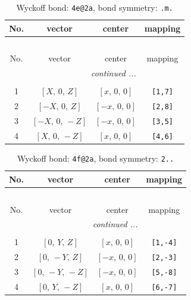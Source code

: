 \documentclass[fleqn,8pt]{jsarticle}
\begin{document}
\renewcommand{\arraystretch}{1.2}
\begin{longtable}{cccc}
\caption{Wyckoff bond: {\tt 4e@2a}, bond symmetry: {\tt .m.}}
 \\
 \hline \hline
No. & vector & center & mapping \\ \hline \endfirsthead

\multicolumn{3}{l}{\tablename\ \thetable{}} \\
 \hline \hline
No. & vector & center & mapping \\ \hline \endhead

 \hline \hline
\multicolumn{3}{r}{\footnotesize\it continued ...} \\ \endfoot

 \hline \hline
\multicolumn{3}{r}{} \\ \endlastfoot

1 & $\left[ X,\, 0,\, Z \right]$ & $\left[ x,\, 0,\, 0 \right]$ & {\tt [1,7]} \\ \hline
2 & $\left[ - X,\, 0,\, Z \right]$ & $\left[ - x,\, 0,\, 0 \right]$ & {\tt [2,8]} \\ \hline
3 & $\left[ - X,\, 0,\, - Z \right]$ & $\left[ - x,\, 0,\, 0 \right]$ & {\tt [3,5]} \\ \hline
4 & $\left[ X,\, 0,\, - Z \right]$ & $\left[ x,\, 0,\, 0 \right]$ & {\tt [4,6]} \\
\end{longtable}
\renewcommand{\arraystretch}{1.2}
\begin{longtable}{cccc}
\caption{Wyckoff bond: {\tt 4f@2a}, bond symmetry: {\tt 2..}}
 \\
 \hline \hline
No. & vector & center & mapping \\ \hline \endfirsthead

\multicolumn{3}{l}{\tablename\ \thetable{}} \\
 \hline \hline
No. & vector & center & mapping \\ \hline \endhead

 \hline \hline
\multicolumn{3}{r}{\footnotesize\it continued ...} \\ \endfoot

 \hline \hline
\multicolumn{3}{r}{} \\ \endlastfoot

1 & $\left[ 0,\, Y,\, Z \right]$ & $\left[ x,\, 0,\, 0 \right]$ & {\tt [1,-4]} \\ \hline
2 & $\left[ 0,\, - Y,\, Z \right]$ & $\left[ - x,\, 0,\, 0 \right]$ & {\tt [2,-3]} \\ \hline
3 & $\left[ 0,\, - Y,\, - Z \right]$ & $\left[ - x,\, 0,\, 0 \right]$ & {\tt [5,-8]} \\ \hline
4 & $\left[ 0,\, Y,\, - Z \right]$ & $\left[ x,\, 0,\, 0 \right]$ & {\tt [6,-7]} \\
\end{longtable}
\end{document}
